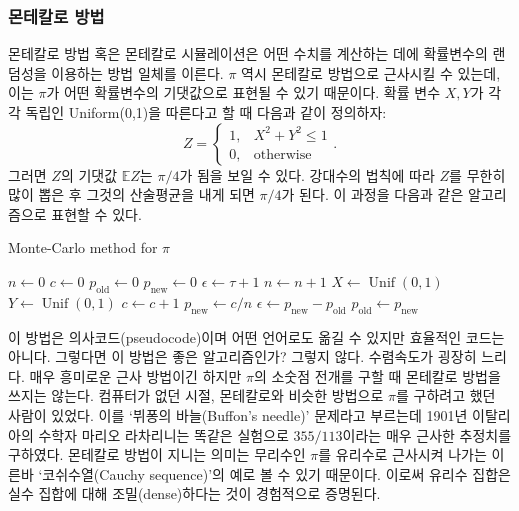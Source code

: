 \documentclass[10pt]{article}
\newcommand{\opn}{\operatorname}
\begin{document}
\subsubsection{몬테칼로 방법}
몬테칼로 방법 혹은 몬테칼로 시뮬레이션은 어떤 수치를 계산하는 데에 확률변수의 랜덤성을 이용하는 방법 일체를 이른다. $\pi$ 역시 몬테칼로 방법으로 근사시킬 수 있는데, 이는 $\pi$가 어떤 확률변수의 기댓값으로 표현될 수 있기 때문이다. 확률 변수 $X, Y$가 각각 독립인 Uniform(0,1)을 따른다고 할 때 다음과 같이 정의하자:
$$
  Z = \begin{cases}1, & X^{2} + Y^{2}\leq 1 \\0, & \text{otherwise} \end{cases}.
$$
그러면 $Z$의 기댓값 $\mathbb{E}Z$는 $\pi/4$가 됨을 보일 수 있다. 강대수의 법칙에 따라 $Z$를 무한히 많이 뽑은 후 그것의 산술평균을 내게 되면 $\pi/4$가 된다. 이 과정을 다음과 같은 알고리즘으로 표현할 수 있다.
\begin{algorithm}
  \caption{Monte-Carlo method for $\pi$}
  \begin{algorithmic}[1]
  \label{MCpi}
    \State $n \gets 0$
    \State $c \gets 0$
    \State $p_{\text{old}} \gets 0$
    \State $p_{\text{new}} \gets 0$
    \State $\epsilon \gets \tau + 1$
    \While{$\epsilon > \tau$}
      \State $n \gets n + 1$
      \State $X \gets \opn{Unif}\left(0,1\right)$
      \State $Y \gets \opn{Unif}\left(0,1\right)$
        \State $c \gets c + 1$
      \EndIf
      \State $p_{\text{new}} \gets c/n$
      \State $\epsilon \gets p_{\text{new}}-p_{\text{old}} $
      \State $p_{\text{old}} \gets p_{\text{new}}$
    \EndWhile
  \EndProcedure
  \end{algorithmic}
\end{algorithm}

이 방법은 의사코드(pseudocode)이며 어떤 언어로도 옮길 수 있지만 효율적인 코드는 아니다.  그렇다면 이 방법은 좋은 알고리즘인가? 그렇지 않다. 수렴속도가 굉장히 느리다. 매우 흥미로운 근사 방법이긴 하지만 $\pi$의 소숫점 전개를 구할 때 몬테칼로 방법을 쓰지는 않는다. 컴퓨터가 없던 시절, 몬테칼로와 비슷한 방법으로 $\pi$를 구하려고 했던 사람이 있었다. 이를 `뷔퐁의 바늘(Buffon's needle)' 문제라고 부르는데 1901년 이탈리아의 수학자 마리오 라차리니는 똑같은 실험으로 $355/113$이라는 매우 근사한 추정치를 구하였다. 몬테칼로 방법이 지니는 의미는 무리수인 $\pi$를 유리수로 근사시켜 나가는 이른바 `코쉬수열(Cauchy sequence)'의 예로 볼 수 있기 때문이다. 이로써 유리수 집합은 실수 집합에 대해 조밀(dense)하다는 것이 경험적으로 증명된다.
\end{document}
